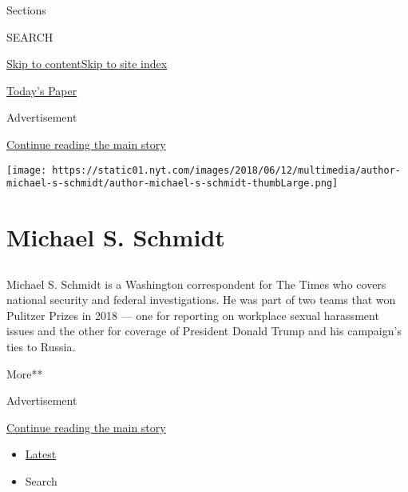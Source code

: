Sections

SEARCH

\protect\hyperlink{site-content}{Skip to
content}\protect\hyperlink{site-index}{Skip to site index}

\href{https://myaccount.nytimes.com/auth/login?response_type=cookie\&client_id=vi}{}

\href{https://www.nytimes.com/section/todayspaper}{Today's Paper}

Advertisement

\protect\hyperlink{after-top}{Continue reading the main story}

\texttt{[image: https://static01.nyt.com/images/2018/06/12/multimedia/author-michael-s-schmidt/author-michael-s-schmidt-thumbLarge.png]}

\hypertarget{michael-s-schmidt}{%
\section{Michael S. Schmidt}\label{michael-s-schmidt}}

\subsection{}

Michael S. Schmidt is a Washington correspondent for The Times who
covers national security and federal investigations. He was part of two
teams that won Pulitzer Prizes in 2018 --- one for reporting on
workplace sexual harassment issues and the other for coverage of
President Donald Trump and his campaign's ties to Russia.

More**

Advertisement

\protect\hyperlink{after-mid1}{Continue reading the main story}

\begin{itemize}
\tightlist
\item
  \protect\hyperlink{stream-panel}{Latest}
\item
  Search
\end{itemize}

